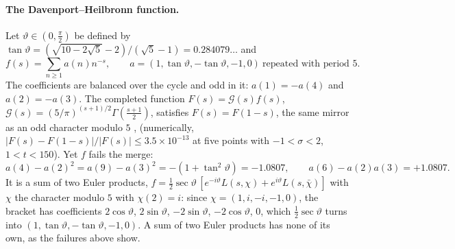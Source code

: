 \documentclass[11pt]{article}
\theoremstyle{definition}\newtheorem{definition}[theorem]{Definition}
\theoremstyle{remark}\newtheorem{remark}[theorem]{Remark}
\begin{document}
\paragraph{The Davenport--Heilbronn function.} Let $\vartheta\in(0,\frac\pi2)$ be defined by $\tan\vartheta=(\sqrt{10-2\sqrt5}-2)/(\sqrt5-1)=0.284079\ldots$ and
\[
f(s)=\sum_{n\ge1}a(n)n^{-s},\qquad a=(1,\tan\vartheta,-\tan\vartheta,-1,0)\ \text{repeated with period }5 .
\]
The coefficients are balanced over the cycle and odd in it: $a(1)=-a(4)$ and $a(2)=-a(3)$. The completed function $F(s)=\mathcal G(s)f(s)$, $\mathcal G(s)=(5/\pi)^{(s+1)/2}\Gamma(\tfrac{s+1}2)$, satisfies $F(s)=F(1-s)$, the same mirror as an odd character modulo $5$ \cite{DH}, \cite[\S10.25]{Titchmarsh} (numerically, $|F(s)-F(1-s)|/|F(s)|\le3.5\times10^{-13}$ at five points with $-1<\sigma<2$, $1<t<150$). Yet $f$ fails the merge:
\[
a(4)-a(2)^2=a(9)-a(3)^2=-(1+\tan^2\vartheta)=-1.0807,\qquad a(6)-a(2)a(3)=+1.0807 .
\]
It is a sum of two Euler products, $f=\tfrac12\sec\vartheta\,[e^{-i\vartheta}L(s,\chi)+e^{i\vartheta}L(s,\bar\chi)]$ with $\chi$ the character modulo $5$ with $\chi(2)=i$: since $\chi=(1,i,-i,-1,0)$, the bracket has coefficients $2\cos\vartheta$, $2\sin\vartheta$, $-2\sin\vartheta$, $-2\cos\vartheta$, $0$, which $\tfrac12\sec\vartheta$ turns into $(1,\tan\vartheta,-\tan\vartheta,-1,0)$. A sum of two Euler products has none of its own, as the failures above show.
\end{document}
